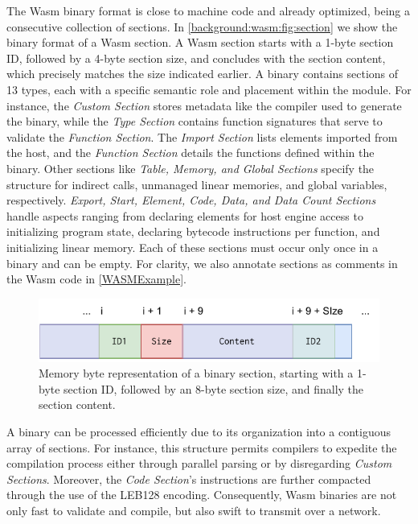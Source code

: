 The Wasm binary format is close to machine code and already optimized, being a consecutive collection of sections.
In \autoref{background:wasm:fig:section} we show the binary format of a Wasm section.
A Wasm section starts with a 1-byte section ID, followed by a 4-byte section size, and concludes with the section content, which precisely matches the size indicated earlier.
A \Wasm binary contains sections of 13 types, each with a specific semantic role and placement within the module. 
For instance, the \emph{Custom Section} stores metadata like the compiler used to generate the binary, while the \emph{Type Section} contains function signatures that serve to validate the \emph{Function Section}. 
The \emph{Import Section} lists elements imported from the host, and the \emph{Function Section} details the functions defined within the binary. 
Other sections like \emph{Table, Memory, and Global Sections} specify the structure for indirect calls, unmanaged linear memories, and global variables, respectively. 
\emph{Export, Start, Element, Code, Data, and Data Count Sections} handle aspects ranging from declaring elements for host engine access to initializing program state, declaring bytecode instructions per function, and initializing linear memory. 
Each of these sections must occur only once in a binary and can be empty.
For clarity, we also annotate sections as comments in the Wasm code in \autoref{WASMExample}.
    

\begin{figure}[h]
    \centering
    \includegraphics[width=0.5\linewidth]{figures/section.pdf}
    \caption{Memory byte representation of a \Wasm binary section, starting with a 1-byte section ID, followed by an 8-byte section size, and finally the section content.}
    \label{background:wasm:fig:section}
\end{figure}

A \Wasm binary can be processed efficiently due to its organization into a contiguous array of sections. 
For instance, this structure permits compilers to expedite the compilation process either through parallel parsing or by disregarding \emph{Custom Sections}. 
Moreover, the \emph{Code Section}'s instructions are further compacted through the use of the LEB128 encoding. 
Consequently, Wasm binaries are not only fast to validate and compile, but also swift to transmit over a network.

